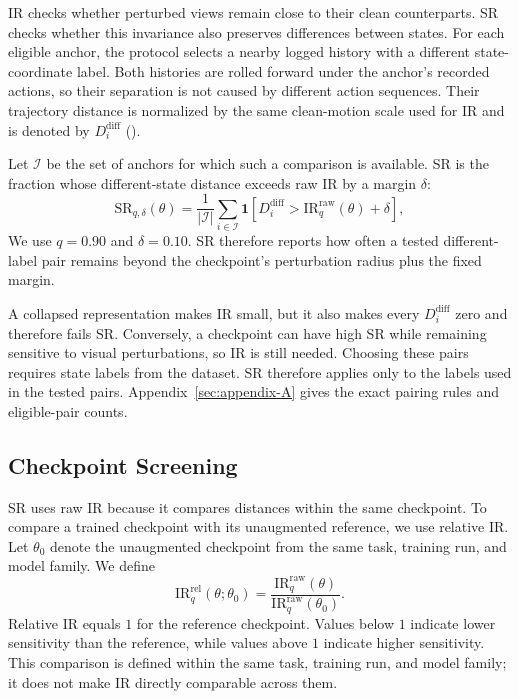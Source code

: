 \documentclass[10pt]{article}
\begin{document}
IR checks whether perturbed views remain close to their clean counterparts. SR
checks whether this invariance also preserves differences between states. For
each eligible anchor, the protocol selects a nearby logged history with a
different state-coordinate label. Both histories are rolled forward under the
anchor's recorded actions, so their separation is not caused by different
action sequences. Their trajectory distance is normalized by the same
clean-motion scale used for IR and is denoted by $D_i^{\mathrm{diff}}$
().

Let $\mathcal I$ be the set of anchors for which such a comparison is
available. SR is the fraction whose different-state distance exceeds raw IR
by a margin $\delta$:
\begin{equation}
\mathrm{SR}_{q,\delta}(\theta)
=
\frac{1}{|\mathcal I|}
\sum_{i\in\mathcal I}
\mathbf 1\!\left[
D_i^{\mathrm{diff}}
>
\mathrm{IR}^{\mathrm{raw}}_q(\theta)+\delta
\right],
\label{eq:sr}
\end{equation}
We use $q=0.90$ and $\delta=0.10$. SR therefore reports how often a tested
different-label pair remains beyond the checkpoint's perturbation radius plus
the fixed margin.

A collapsed representation makes IR small, but it also makes every
$D_i^{\mathrm{diff}}$ zero and therefore fails SR. Conversely, a checkpoint
can have high SR while remaining sensitive to visual perturbations, so IR is
still needed. Choosing these pairs requires state labels from the dataset. SR
therefore applies only to the labels used in the tested pairs.
Appendix~\ref{sec:appendix-A} gives the exact pairing rules and eligible-pair
counts.

\subsection{Checkpoint Screening}\label{sec:checkpoint-threshold-selection}

SR uses raw IR because it compares distances within the same checkpoint. To
compare a trained checkpoint with its unaugmented reference, we use relative
IR. Let $\theta_0$ denote the unaugmented checkpoint from the same task,
training run, and model family. We define
\begin{equation}
\mathrm{IR}^{\mathrm{rel}}_{q}(\theta;\theta_0)
=
\frac{\mathrm{IR}^{\mathrm{raw}}_{q}(\theta)}
{\mathrm{IR}^{\mathrm{raw}}_{q}(\theta_0)}.
\label{eq:ir-relative}
\end{equation}
Relative IR equals $1$ for the reference checkpoint. Values below $1$
indicate lower sensitivity than the reference, while values above $1$
indicate higher sensitivity. This comparison is defined within the same task,
training run, and model family; it does not make IR directly comparable
across them.
\end{document}
